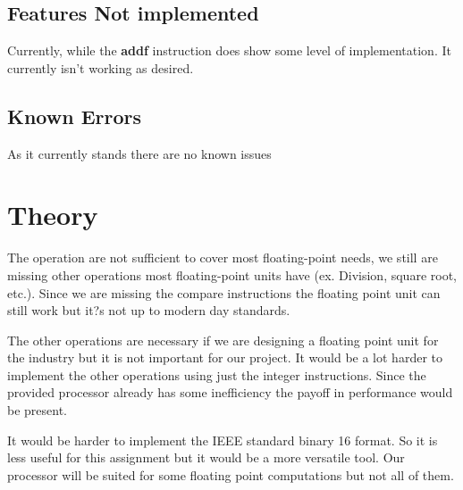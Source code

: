 \documentclass[conference]{IEEEtran}
\begin{document}
\subsection{Features Not implemented}
Currently, while the \textbf{addf} instruction does show some level of implementation. It currently isn't 
working as desired. 



\subsection{Known Errors}
As it currently stands there are no known issues


\section{Theory}
The operation are not sufficient to cover most floating-point needs, we still are missing other operations
most floating-point units have (ex. Division, square root, etc.). Since we are missing the compare
instructions the floating point unit can still work but it?s not up to modern day standards.

The other operations are necessary if we are designing a floating point unit for the industry but it is not
important for our project. It would be a lot harder to implement the other operations using just
the integer instructions. Since the provided processor already has some inefficiency the payoff in performance would be present.

It would be harder to implement the IEEE standard binary 16 format. So it is less useful for this assignment
 but it would be a more versatile tool. Our processor will be suited for some floating point computations but
 not all of them.

\end{document}
